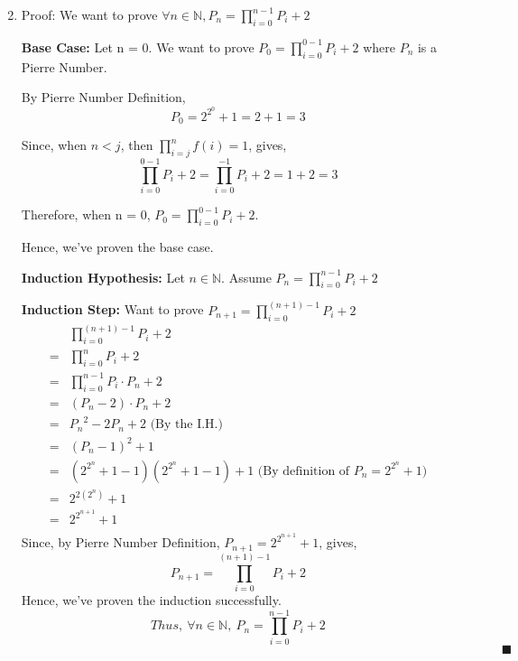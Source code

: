 \documentclass[12pt]{article}
\begin{document}
\begin{enumerate}[label=\alph*)]
	\setcounter{enumi}{1}
	\item Proof: We want to prove $\forall n \in \mathbb{N}, P_{n} =  \prod_{i=0}^{n-1} P_i + 2$

\textbf{Base Case:} Let n = 0. We want to prove $P_0 =  \prod_{i=0}^{0-1}{P_i + 2}$  where $P_n$ is a Pierre Number.

By Pierre Number Definition, 
$$P_0 = 2^{2^0} + 1 = 2 + 1 = 3$$

Since, when $n  < j$, then $\prod_{i=j}^{n} f(i) = 1$, gives, 
$$ \prod_{i=0}^{0-1} P_i + 2 = \prod_{i=0}^{-1} P_i + 2 = 1 + 2 = 3$$

Therefore, when n = 0, $P_0 =  \prod_{i=0}^{0-1}{P_i + 2}$.

Hence, we've proven the base case.
    
\textbf{Induction Hypothesis:} Let $n \in \mathbb{N}$. Assume $P_n =  \prod_{i=0}^{n-1} P_i + 2$

\textbf{Induction Step:} Want to prove $P_{n+1} =  \prod_{i=0}^{(n+1)-1} P_i + 2$
\begin{align*}
    &\prod_{i=0}^{(n+1)-1} P_i + 2 \\
    = &\prod_{i=0}^{n} P_i + 2 \\
    = &\prod_{i=0}^{n-1} P_i \cdot P_n + 2 \\
    = &(P_n - 2) \cdot P_n + 2  \\
    = &{P_n}^2 - 2P_n + 2\text{ (By the I.H.)} \\
    = &(P_n - 1)^2 + 1 \\
    = &(2^{2^n} + 1 - 1)(2^{2^n} + 1 - 1) + 1 \text{ (By definition of } P_n = 2^{2^n} + 1)\\
    = &2^{2(2^n)} + 1 \\
    = &2^{2^{n+1}} + 1 \\ 
\end{align*}
Since, by Pierre Number Definition, $P_{n+1} = 2^{2^{n+1}} + 1$, gives,
$$P_{n+1} =  \prod_{i=0}^{(n+1)-1} P_i + 2$$
Hence, we've proven the induction successfully. 
$$Thus,\ \forall n \in \mathbb{N},\ P_{n} =  \prod_{i=0}^{n-1} P_i + 2$$
$\quad \quad \quad \quad \quad \quad \quad \quad \quad \quad \quad \quad \quad \quad \quad \quad \quad \quad \quad \quad \quad \quad \quad \quad \quad \quad \quad \quad \quad \quad \quad \quad \quad \quad \quad \quad \quad \quad \blacksquare $

\end{enumerate}
\end{document}
